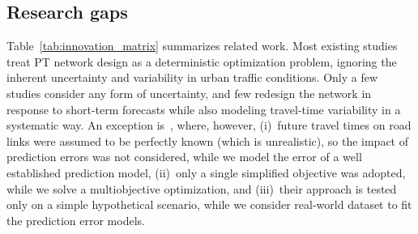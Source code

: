\documentclass[a4paper,fleqn]{cas-sc}
\begin{document}
\subsection{Research gaps}
Table~\ref{tab:innovation_matrix} summarizes related work.
%
Most existing studies treat PT network design as a deterministic optimization problem, ignoring the inherent uncertainty and variability in urban traffic conditions. Only a few studies consider any form of uncertainty, and few redesign the network in response to short-term forecasts while also modeling travel-time variability in a systematic way.
%
An exception is~\cite{guo2025data}, where, however, (i)~future travel times on road links were assumed to be perfectly known (which is unrealistic), so the impact of prediction errors was not considered, while we model the error of a well established prediction model, (ii)~only a single simplified objective was adopted, while we solve a multiobjective optimization, and (iii)~their approach is tested only on a simple hypothetical scenario, while we consider real-world dataset to fit the prediction error models.
\end{document}

